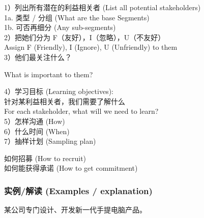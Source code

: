 1）列出所有潜在的利益相关者 (List all potential stakeholders)\\
1a. 类型 / 分组 (What are the base Segments)\\
1b. 可否再细分 (Any sub-segments)\\	
2）把她们分为 F（友好），I（忽略），U（不友好）\\
Assign F (Friendly), I (Ignore), U (Unfriendly) to them\\
3）他们最关注什么？

\begin{description}
\tightlist
\item[]
What is important to them?\\
\end{description}

4）学习目标 (Learning objectives):\\
针对某利益相关者，我们需要了解什么\\
For each stakeholder, what will we need to learn?\\	
5）怎样沟通 (How)\\
6）什么时间 (When)\\
7）抽样计划 (Sampling plan)

\begin{description}
\tightlist
\item[]
如何招募 (How to recruit)\\

如何能获得承诺 (How to get commitment)\\
\end{description}

\begin{description}
\item[]
\end{description}

\hypertarget{ux5b9eux4f8bux89e3ux8bfb-examples-explanation}{%
\subsubsection{\texorpdfstring{\textbf{实例/解读 (Examples /
explanation)}}{实例/解读 (Examples / explanation)}}\label{ux5b9eux4f8bux89e3ux8bfb-examples-explanation}}

某公司专门设计、开发新一代手提电脑产品。

